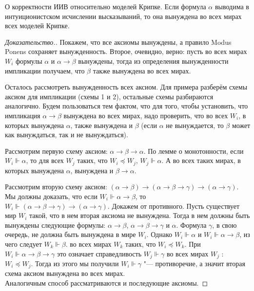 \begin{theorem}{О корректности ИИВ относительно моделей Крипке.}
Если формула $\alpha$ выводима в интуиционистском исчислении высказываний, 
то она вынуждена во всех мирах всех моделей Крипке.
\end{theorem}
\begin{proof}[Доказательство.] Покажем, что все аксиомы вынуждены, а правило Modus Ponens сохраняет вынужденность. 
Второе, очевидно, верно: пусть во всех мирах $W_i$ формулы $\alpha$ и $\alpha \rightarrow \beta$ вынуждены, тогда из определения 
вынужденности импликации получаем, что $\beta$ также вынуждена во всех мирах.

Осталось рассмотреть вынужденность всех аксиом. Для примера разберём схемы аксиом для
импликации (схемы 1 и 2), остальные схемы разбираются аналогично.
Будем пользоваться тем фактом, что для того, чтобы установить, что импликация $\alpha \rightarrow \beta$ вынуждена во всех мирах, 
надо проверить, что во всех  $W_i$, в которых вынуждена $\alpha$, также вынуждена и $\beta$ 
(если $\alpha$ не вынуждается, то $\beta$ может как вынуждаться, так и не вынуждаться). 

Рассмотрим первую схему аксиом: $\alpha \rightarrow \beta \rightarrow \alpha$. 
По лемме о монотонности, если $W_i \Vdash \alpha$, то для всех $W_j$ таких, что $W_i \preceq W_j$, $W_j \Vdash \alpha$.
А во всех таких мирах, в которых вынуждена $\alpha$, вынуждена и $\beta \rightarrow \alpha$.

Рассмотрим вторую схему аксиом: $(\alpha \rightarrow \beta) \rightarrow (\alpha \rightarrow \beta \rightarrow \gamma) \rightarrow (\alpha \rightarrow \gamma)$.
Мы должны доказать, что если $W_i \Vdash \alpha \rightarrow \beta$, то $W_i \Vdash (\alpha \rightarrow \beta \rightarrow \gamma) \rightarrow (\alpha \rightarrow \gamma)$. 
Докажем от противного. Пусть существует мир  $W_i$ такой, что в нем вторая аксиома не вынуждена. 
Тогда в нем должны быть вынуждены следующие формулы: $\alpha \rightarrow \beta$, $\alpha \rightarrow \beta \rightarrow \gamma$ и $\alpha$. 
Формула $\gamma$, в свою очередь, не должна быть вынуждена в мире $W_i$. 
Однако $W_i \Vdash \alpha$ и $W_i \Vdash \alpha \rightarrow \beta$, из чего следует  $W_k \Vdash \beta$.
во всех мирах $W_k$ таких, что  $W_i \preceq W_k$. При $W_i \Vdash \alpha \rightarrow \beta \rightarrow \gamma$ это означает справедливость
$W_j \Vdash \gamma$ во всех мирах $W_j$ : $W_i \preceq W_j$. Тогда из этого мы получили $W_i \Vdash \gamma$ "--- противоречие, а значит 
вторая схема аксиом вынуждена во всех мирах.
\\Аналогичным способ рассматриваются и последующие аксиомы.
\end{proof}

